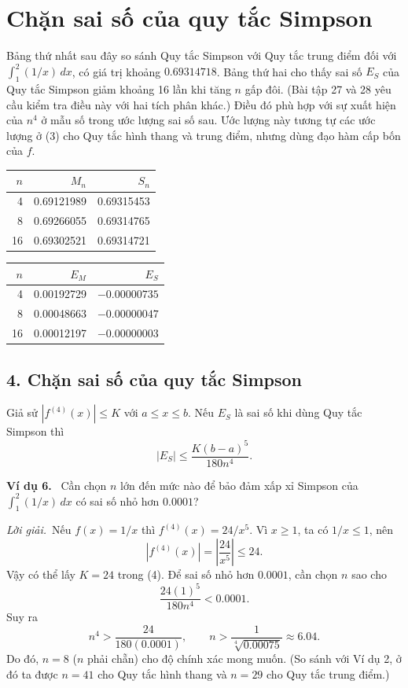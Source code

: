 \documentclass[12pt,a4paper]{article}
\newcommand{\ex}[1]{\par\medskip\noindent\textbf{Ví dụ #1.}\ }
\newcommand{\sol}{\par\nopagebreak[4]\noindent\textit{Lời giải.}\ }
\begin{document}
\section*{Chặn sai số của quy tắc Simpson}
Bảng thứ nhất sau đây so sánh Quy tắc Simpson với Quy tắc trung điểm đối với $\int_1^2(1/x)\,dx$, có giá trị khoảng $0.69314718$. Bảng thứ hai cho thấy sai số $E_S$ của Quy tắc Simpson giảm khoảng 16 lần khi tăng $n$ gấp đôi. (Bài tập 27 và 28 yêu cầu kiểm tra điều này với hai tích phân khác.) Điều đó phù hợp với sự xuất hiện của $n^4$ ở mẫu số trong ước lượng sai số sau. Ước lượng này tương tự các ước lượng ở (3) cho Quy tắc hình thang và trung điểm, nhưng dùng đạo hàm cấp bốn của $f$.
\begin{center}\begin{tabular}{r r r}\toprule
$n$&$M_n$&$S_n$\\\midrule
4&0.69121989&0.69315453\\
8&0.69266055&0.69314765\\
16&0.69302521&0.69314721\\\bottomrule
\end{tabular}\end{center}
\begin{center}\begin{tabular}{r r r}\toprule
$n$&$E_M$&$E_S$\\\midrule
4&0.00192729&$-0.00000735$\\
8&0.00048663&$-0.00000047$\\
16&0.00012197&$-0.00000003$\\\bottomrule
\end{tabular}\end{center}
\subsection*{4. Chặn sai số của quy tắc Simpson}
Giả sử $|f^{(4)}(x)|\le K$ với $a\le x\le b$. Nếu $E_S$ là sai số khi dùng Quy tắc Simpson thì
\begin{equation}|E_S|\le\frac{K(b-a)^5}{180n^4}.\tag{4}\end{equation}

\ex{6} Cần chọn $n$ lớn đến mức nào để bảo đảm xấp xỉ Simpson của $\int_1^2(1/x)\,dx$ có sai số nhỏ hơn $0.0001$?
\sol Nếu $f(x)=1/x$ thì $f^{(4)}(x)=24/x^5$. Vì $x\ge1$, ta có $1/x\le1$, nên
\[|f^{(4)}(x)|=\left|\frac{24}{x^5}\right|\le24.\]
Vậy có thể lấy $K=24$ trong (4). Để sai số nhỏ hơn $0.0001$, cần chọn $n$ sao cho
\[\frac{24(1)^5}{180n^4}<0.0001.\]
Suy ra
\[n^4>\frac{24}{180(0.0001)},\qquad n>\frac1{\sqrt[4]{0.00075}}\approx6.04.\]
Do đó, $n=8$ ($n$ phải chẵn) cho độ chính xác mong muốn. (So sánh với Ví dụ 2, ở đó ta được $n=41$ cho Quy tắc hình thang và $n=29$ cho Quy tắc trung điểm.)
\end{document}
